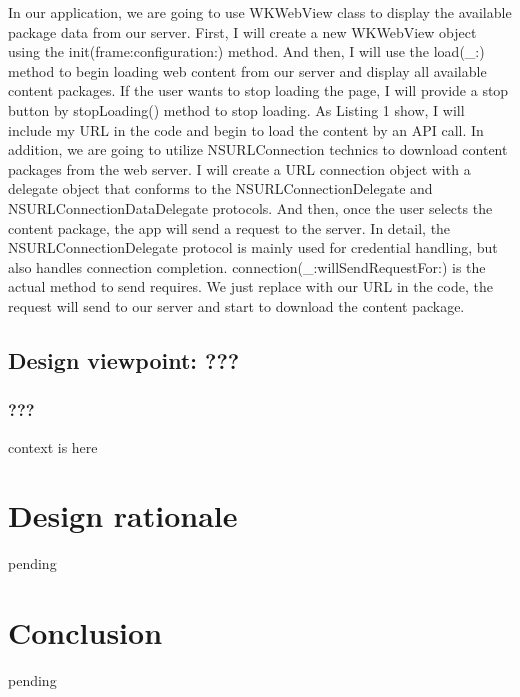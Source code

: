 \documentclass[letterpaper, 10pt,titlepage]{article}
\begin{document}
In our application, we are going to use WKWebView class to display the available package data from our server. First, I will create a new WKWebView object using the init(frame:configuration:) method. And then, I will use the load(\_:) method to begin loading web content from our server and display all available content packages. If the user wants to stop loading the page, I will provide a stop button by stopLoading() method to stop loading. As Listing 1 show, I will include my URL in the code and begin to load the content by an API call. In addition, we are going to utilize NSURLConnection technics to download content packages from the web server. I will create a URL connection object with a delegate object that conforms to the NSURLConnectionDelegate and NSURLConnectionDataDelegate protocols. And then, once the user selects the content package, the app will send a request to the server. In detail, the NSURLConnectionDelegate protocol is mainly used for credential handling, but also handles connection completion. connection(\_:willSendRequestFor:) is the actual method to send requires. We just replace with our URL in the code, the request will send to our server and start to download the content package.



\subsection{Design viewpoint: ???}

\subsubsection{???}
context is here















\section{Design rationale}
pending



\section{Conclusion}
pending
\end{document}

